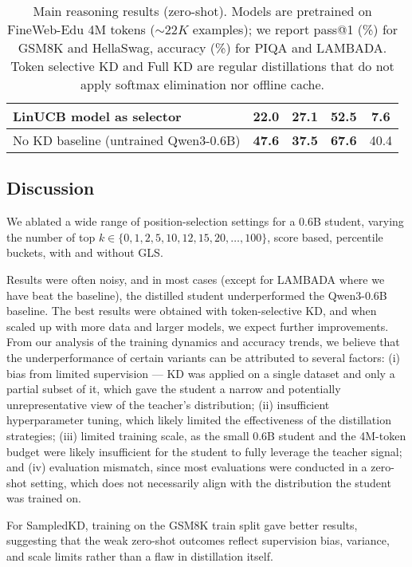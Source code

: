 \documentclass[11pt]{article}
\begin{document}
\begin{table*}[t]
\begin{tabular}{lcccc}
		\quad LinUCB model as selector                      & 22.0                  & 27.1                      & 52.5                 & 7.6                     \\
		\midrule
		No KD baseline (untrained Qwen3-0.6B)               & \textbf{47.6}         & \textbf{37.5}             & \textbf{67.6}        & 40.4                    \\
		\bottomrule
	\end{tabular}
	\caption{Main reasoning results (zero-shot). Models are pretrained on FineWeb-Edu 4M tokens ($\sim 22K$ examples); we report pass@1 (\%) for GSM8K and HellaSwag, accuracy (\%) for PIQA and LAMBADA.
		Token selective KD and Full KD are regular distillations that do not apply softmax elimination nor offline cache.}
	\label{tab:main-reasoning}
\end{table*}


\subsection{Discussion}
\label{sec:discussion}
We ablated a wide range of position-selection settings for a 0.6B student, varying the number of top $k \in \{0,1,2,5,10,12,15,20,\ldots,100\}$, score based, percentile buckets, with and without GLS.

Results were often noisy, and in most cases (except for LAMBADA where we have beat the baseline), the distilled student underperformed the Qwen3-0.6B baseline.
The best results were obtained with token-selective KD, and when scaled up with more data and larger models, we expect further improvements.
From our analysis of the training dynamics and accuracy trends, we believe that the underperformance of certain variants can be attributed to several factors:
(i) bias from limited supervision — KD was applied on a single dataset and only a partial subset of it, which gave the student a narrow and potentially unrepresentative view of the teacher's distribution;
(ii) insufficient hyperparameter tuning, which likely limited the effectiveness of the distillation strategies;
(iii) limited training scale, as the small 0.6B student and the 4M-token budget were likely insufficient for the student to fully leverage the teacher signal; and 
(iv) evaluation mismatch, since most evaluations were conducted in a zero-shot setting, 
which does not necessarily align with the distribution the student was trained on.

For SampledKD, training on the GSM8K train split gave better results, suggesting that the weak zero-shot outcomes reflect supervision bias, variance, and scale limits rather than a flaw in distillation itself.
\end{document}
